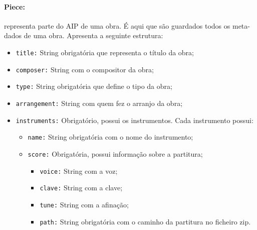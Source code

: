 \paragraph{\textbf{Piece:}} representa parte do AIP de uma obra. É aqui que são guardados todos os meta-dados de uma obra. Apresenta a seguinte estrutura:
    \begin{itemize}
        \item \texttt{title:} String obrigatória que representa o título da obra;
        \item \texttt{composer:} String com o compositor da obra;
        \item \texttt{type:} String obrigatória que define o tipo da obra;
        \item \texttt{arrangement:} String com quem fez o arranjo da obra;
        \item \texttt{instruments:} Obrigatório, possui os instrumentos. Cada instrumento possui:
            \begin{itemize}
                \item \texttt{name:} String obrigatória com o nome do instrumento;
                \item \texttt{score:} Obrigatória, possui informação sobre a partitura;
                    \begin{itemize}
                        \item \texttt{voice:} String com a voz;
                        \item \texttt{clave:} String com a clave;
                        \item \texttt{tune:} String com a afinação;
                        \item \texttt{path:} String obrigatória com o caminho da partitura no ficheiro zip.
                    \end{itemize}
            \end{itemize}
    \end{itemize}
    
